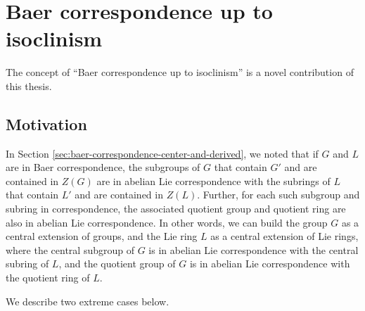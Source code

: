 \documentclass{ucetd}
\begin{document}
\section{Baer correspondence up to isoclinism}\label{sec:bcuti}

The concept of ``Baer correspondence up to isoclinism'' is a novel
contribution of this thesis.

\subsection{Motivation}

In Section \ref{sec:baer-correspondence-center-and-derived}, we noted
that if $G$ and $L$ are in Baer correspondence, the subgroups of $G$
that contain $G'$ and are contained in $Z(G)$ are in abelian Lie
correspondence with the subrings of $L$ that contain $L'$ and are
contained in $Z(L)$. Further, for each such subgroup and subring in
correspondence, the associated quotient group and quotient ring are
also in abelian Lie correspondence. In other words, we can build the
group $G$ as a central extension of groups, and the Lie ring $L$ as a
central extension of Lie rings, where the central subgroup of $G$ is
in abelian Lie correspondence with the central subring of $L$, and the
quotient group of $G$ is in abelian Lie correspondence with the
quotient ring of $L$.

We describe two extreme cases below.
\end{document}
